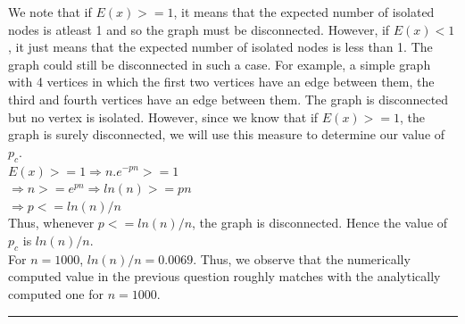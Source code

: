 \documentclass{article}
\begin{document}
We note that if $E(x)>=1$, it means that the expected number of isolated nodes is 
atleast 1 and so the graph must be disconnected. However, if $E(x) <1$, it just means that the expected number of isolated nodes
is less than 1. The graph could still be disconnected in such a case. For example, a simple graph with 4 vertices in which
the first two vertices have an edge between them, the third and fourth vertices have an edge between them. The graph is
disconnected but no vertex is isolated. However, since we know that if $E(x)>=1$, the graph is surely disconnected,
we will use this measure to determine our value of $p_c$.\\
$E(x)>=1 \Rightarrow n.e^{-pn} >=1 $\\
$\Rightarrow n>= e^{pn} \Rightarrow ln(n) >=pn $\\
$\Rightarrow p<=ln(n)/n$\\
Thus, whenever $p<=ln(n)/n$, the graph is disconnected. Hence the value of $p_c$ is $ln(n)/n$.\\

For $n=1000$, $ln(n)/n = 0.0069$. Thus, we observe that the numerically computed value in the previous question 
roughly matches with the analytically computed one for $n=1000$.\\

\hrule
\end{document}
